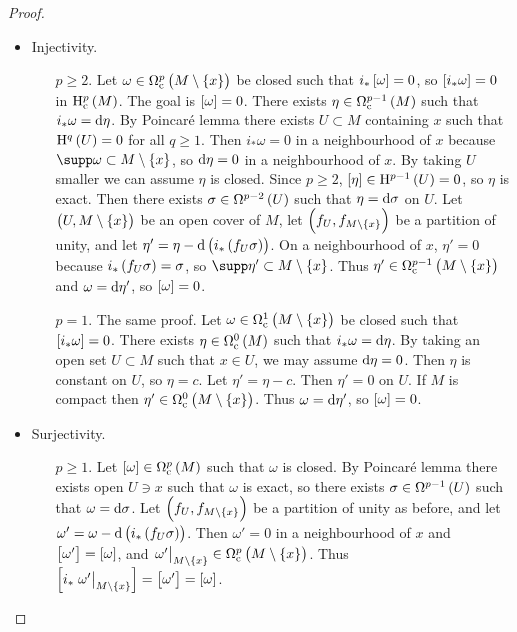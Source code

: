 \begin{proof}
\hfill
\begin{itemize}
\item Injectivity.
\begin{itemize}
\item[$ p \ge 2 $.] Let $ \omega \in \Omega_\c^p\br{M \setminus \cbr{x}} $ be closed such that $ i_*\sbr{\omega} = 0 $, so $ \sbr{i_*\omega} = 0 $ in $ \H_\c^p\br{M} $. The goal is $ \sbr{\omega} = 0 $. There exists $ \eta \in \Omega_\c^{p - 1}\br{M} $ such that $ i_*\omega = \mathrm{d}\eta $. By Poincar\'e lemma there exists $ U \subset M $ containing $ x $ such that $ \H^q\br{U} = 0 $ for all $ q \ge 1 $. Then $ i_*\omega = 0 $ in a neighbourhood of $ x $ because $ \supp \omega \subset M \setminus \cbr{x} $, so $ \mathrm{d}\eta = 0 $ in a neighbourhood of $ x $. By taking $ U $ smaller we can assume $ \eta $ is closed. Since $ p \ge 2 $, $ \sbr{\eta} \in \H^{p - 1}\br{U} = 0 $, so $ \eta $ is exact. Then there exists $ \sigma \in \Omega^{p - 2}\br{U} $ such that $ \eta = \mathrm{d}\sigma $ on $ U $. Let $ \br{U, M \setminus \cbr{x}} $ be an open cover of $ M $, let $ \br{f_U, f_{M \setminus \cbr{x}}} $ be a partition of unity, and let $ \eta' = \eta - \d\br{i_*\br{f_U\sigma}} $. On a neighbourhood of $ x $, $ \eta' = 0 $ because $ i_*\br{f_U\sigma} = \sigma $, so $ \supp \eta' \subset M \setminus \cbr{x} $. Thus $ \eta' \in \Omega_\c^{p - 1}\br{M \setminus \cbr{x}} $ and $ \omega = \mathrm{d}\eta' $, so $ \sbr{\omega} = 0 $.
\item[$ p = 1 $.] The same proof. Let $ \omega \in \Omega_\c^1\br{M \setminus \cbr{x}} $ be closed such that $ \sbr{i_*\omega} = 0 $. There exists $ \eta \in \Omega_\c^0\br{M} $ such that $ i_*\omega = \mathrm{d}\eta $. By taking an open set $ U \subset M $ such that $ x \in U $, we may assume $ \mathrm{d}\eta = 0 $. Then $ \eta $ is constant on $ U $, so $ \eta = c $. Let $ \eta' = \eta - c $. Then $ \eta' = 0 $ on $ U $. If $ M $ is compact then $ \eta' \in \Omega_\c^0\br{M \setminus \cbr{x}} $. Thus $ \omega = \mathrm{d}\eta' $, so $ \sbr{\omega} = 0 $.
\end{itemize}
\item Surjectivity.
\begin{itemize}
\item[$ p \ge 1 $.] Let $ \sbr{\omega} \in \Omega_\c^p\br{M} $ such that $ \omega $ is closed. By Poincar\'e lemma there exists open $ U \ni x $ such that $ \omega $ is exact, so there exists $ \sigma \in \Omega^{p - 1}\br{U} $ such that $ \omega = \mathrm{d}\sigma $. Let $ \br{f_U, f_{M \setminus \cbr{x}}} $ be a partition of unity as before, and let $ \omega' = \omega - \d\br{i_*\br{f_U\sigma}} $. Then $ \omega' = 0 $ in a neighbourhood of $ x $ and $ \sbr{\omega'} = \sbr{\omega} $, and $ \eval{\omega'}_{M \setminus \cbr{x}} \in \Omega_\c^p\br{M \setminus \cbr{x}} $. Thus $ \sbr{i_*\eval{\omega'}_{M \setminus \cbr{x}}} = \sbr{\omega'} = \sbr{\omega} $.
\end{itemize}
\end{itemize}
\end{proof}

